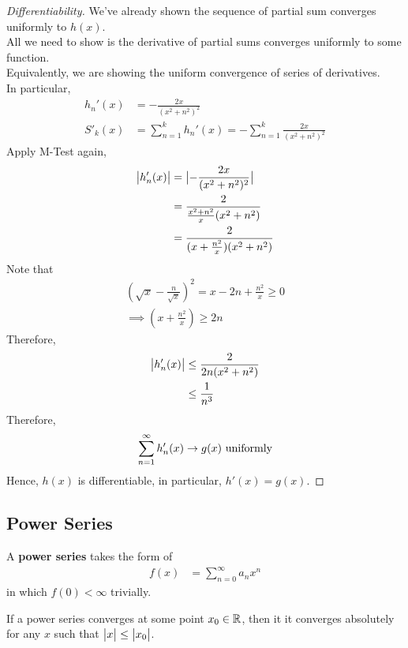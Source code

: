 \documentclass[11pt]{article}
\begin{document}
 	\begin{proof}[Differentiability]
 		We've already shown the sequence of partial sum converges uniformly to $h(x)$. \\
 		All we need to show is the derivative of partial sums converges uniformly to some function. \\
 		Equivalently, we are showing the uniform convergence of series of derivatives. \\
 		In particular,
 		\begin{align}
 			h_n'(x) &= -\frac{2x}{(x^2 + n^2)^2} \\
 			S'_k(x) &= \sum_{n=1}^k h_n'(x) = - \sum_{n=1}^k \frac{2x}{(x^2 + n^2)^2}
 		\end{align}
 		Apply M-Test again,
 		\begin{align}
 			\big \vert {h_n'(x)} \big \vert &= \big \vert {-\frac{2x}{(x^2 + n^2)^2}} \big \vert \\
 			&= \frac{2}{\frac{x^2+n^2}{x}(x^2+n^2)} \\
 			&= \frac{2}{(x + \frac{n^2}{x})(x^2 + n^2)}
 		\end{align}
 		Note that 
 		\begin{align}
 			\left(\sqrt{x} - \frac{n}{\sqrt{x}} \right)^2 = x - 2n + \frac{n^2}{x} \geq 0 \\
 			\implies \left(x + \frac{n^2}{x} \right) \geq 2n
 		\end{align}
 		Therefore,
 		\begin{align}
 			\big \vert {h_n'(x)} \big \vert &\leq \frac{2}{2n(x^2 + n^2)} \\
 			&\leq \frac{1}{n^3}
 		\end{align}
 		Therefore,
 		\begin{align}
 			\sum_{n=1}^\infty h'_n(x) \to g(x) \text{{ uniformly}}
 		\end{align}
 		Hence, $h(x)$ is differentiable, in particular, $h'(x) = g(x)$.
 	\end{proof}
 	
 	\subsection{Power Series}
 	\begin{definition}
 		A \textbf{power series} takes the form of 
 		\begin{align}
 			f(x) &= \sum_{n=0}^\infty a_n x^n
 		\end{align}
 		in which $f(0) < \infty$ trivially.
 	\end{definition}
 	
 	\begin{theorem}
 		If a power series converges at some point $x_0 \in \mathbb{R}$, then it it converges absolutely for any $x$ such that $\big \vert {x} \big \vert \leq \big \vert {x_0} \big \vert$. 
 	\end{theorem}
 	
\end{document}
